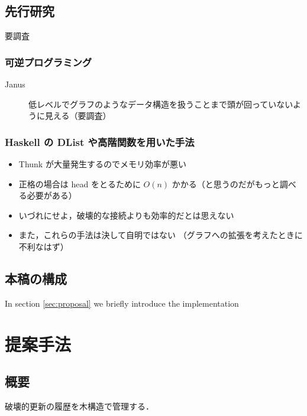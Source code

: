 \documentclass[10pt, a4j, twocolumn]{scrartcl}
\begin{document}
\subsection{先行研究}
\label{sec:org83ac2d1}

要調査

\subsubsection{可逆プログラミング}
\label{sec:orgb2afb8d}
\begin{description}
\item[{Janus}] 低レベルでグラフのようなデータ構造を扱うことまで頭が回っていないように見える（要調査）
\end{description}


\subsubsection{Haskell の DList や高階関数を用いた手法}
\label{sec:org74b408e}
\begin{itemize}
\item Thunk が大量発生するのでメモリ効率が悪い
\item 正格の場合は head をとるために \(O(n)\) かかる（と思うのだがもっと調べる必要がある）
\item いづれにせよ，破壊的な接続よりも効率的だとは思えない
\item また，これらの手法は決して自明ではない
（グラフへの拡張を考えたときに不利なはず）
\end{itemize}


\subsection{本稿の構成}
\label{sec:orgf89e8db}

In section \ref{sec:proposal} we briefly introduce the implementation


\section{提案手法}
\label{sec:org10a2421}

\label{sec:proposal}

\subsection{概要}
\label{sec:orgc1d5d3e}

破壊的更新の履歴を木構造で管理する．
\end{document}
